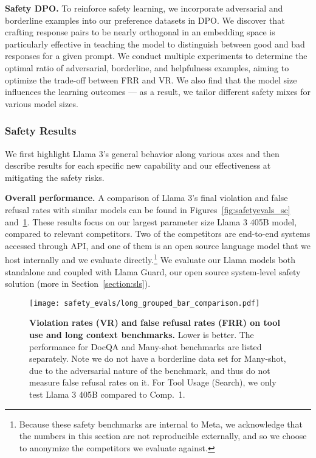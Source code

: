 \textbf{Safety DPO.}
To reinforce safety learning, we incorporate adversarial and borderline examples into our preference datasets in DPO. We discover that crafting response pairs to be nearly orthogonal in an embedding space is particularly effective in teaching the model to distinguish between good and bad responses for a given prompt. We conduct multiple experiments to determine the optimal ratio of adversarial, borderline, and helpfulness examples, aiming to optimize the trade-off between FRR and VR. We also find that the model size influences the learning outcomes --- as a result, we tailor different safety mixes for various model sizes.


\subsubsection{Safety Results}

We first highlight Llama 3's general behavior along various axes and then describe results for each specific new capability and our effectiveness at mitigating the safety risks.

\textbf{Overall performance.}
A comparison of Llama 3's final violation and false refusal rates with similar models can be found in Figures~\ref{fig:safetyevals_sc} and~\ref{fig:safetyevals_tools_lc}.  These results focus on our largest parameter size Llama 3 405B model, compared to relevant competitors. Two of the competitors are end-to-end systems accessed through API, and one of them is an open source language model that we host internally and we evaluate directly.\footnote{Because these safety benchmarks are internal to Meta, we acknowledge that the numbers in this section are not reproducible externally, and so we choose to anonymize the competitors we evaluate against.} We evaluate our Llama models both standalone and coupled with Llama Guard, our open source system-level safety solution (more in Section~\ref{section:sls}).  

\begin{figure}[t]
    \centering
    \texttt{[image: safety\_evals/long\_grouped\_bar\_comparison.pdf]} 
    \caption{\textbf{Violation rates (VR) and false refusal rates (FRR) on tool use and long context benchmarks.} Lower is better. The performance for DocQA and Many-shot benchmarks are listed separately. Note we do not have a borderline data set for Many-shot, due to the adversarial nature of the benchmark, and thus do not measure false refusal rates on it. For Tool Usage (Search), we only test Llama 3 405B compared to Comp.~1.}
    \label{fig:safetyevals_tools_lc}
\end{figure}

